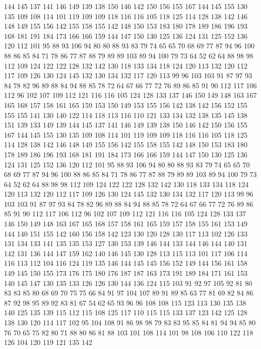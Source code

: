 144 145 137 141 146 149 139 138 150 146 142 150 156 155 167 144 145 155 130 135
109 108 114 101 119 109 109 118 116 116 105 118 125 114 128 138 142 146 148 149
155 156 142 155 158 155 142 148 150 153 183 180 178 189 186 196 193 168 181 191
184 173 166 166 159 144 147 150 130 125 136 124 131 125 152 136 120 112 101 95
88 93 106 94 80 80 88 93 83 79 74 65 65 70 68 69 77 87 94 96
100 88 86 85 84 71 78 86 77 87 88 79 89 89 103 89 94 100 79 73
64 52 62 64 88 98 98 112 109 124 122 122 128 132 142 130 118 133 134 118
124 120 113 132 120 112 117 109 126 130 124 145 132 130 134 132 117 120 113 99
96 103 103 91 87 97 93 84 78 82 96 89 88 84 94 88 85 78 72 64
67 66 77 72 76 89 86 85 91 90 112 117 106 112 96 102 107 109 112 121
116 116 105 124 128 133 137 146 150 149 148 163 167 165 168 157 158 161 165 159
153 150 149 153 155 156 142 138 142 156 152 155 155 155 141 130 140 122 114 118
113 116 110 121 133 134 132 138 135 145 138 151 139 133 149 139 144 145 137 141
146 149 139 138 150 146 142 150 156 155 167 144 145 155 130 135 109 108 114 101
119 109 109 118 116 116 105 118 125 114 128 138 142 146 148 149 155 156 142 155
158 155 142 148 150 153 183 180 178 189 186 196 193 168 181 191 184 173 166 166
159 144 147 150 130 125 136 124 131 125 152 136 120 112 101 95 88 93 106 94
80 80 88 93 83 79 74 65 65 70 68 69 77 87 94 96 100 88 86 85
84 71 78 86 77 87 88 79 89 89 103 89 94 100 79 73 64 52 62 64
88 98 98 112 109 124 122 122 128 132 142 130 118 133 134 118 124 120 113 132
120 112 117 109 126 130 124 145 132 130 134 132 117 120 113 99 96 103 103 91
87 97 93 84 78 82 96 89 88 84 94 88 85 78 72 64 67 66 77 72
76 89 86 85 91 90 112 117 106 112 96 102 107 109 112 121 116 116 105 124
128 133 137 146 150 149 148 163 167 165 168 157 158 161 165 159 157 158 155 161
153 149 144 140 151 155 142 160 156 158 142 123 130 120 128 130 117 113 102 126
133 131 134 133 141 135 135 153 127 130 153 139 146 144 133 144 146 144 140 131
142 131 136 144 147 159 162 140 146 145 130 128 113 115 113 101 117 106 114 116
113 112 104 116 124 119 135 146 144 145 145 156 152 149 144 156 161 158 149 145
150 155 173 176 175 180 176 187 187 163 173 191 189 184 171 161 153 140 145 147
130 135 133 126 126 130 144 136 124 115 103 91 92 97 105 92 81 80 83 83
85 80 68 69 70 75 75 66 84 91 97 104 107 89 91 89 85 63 77 81
69 82 84 86 87 92 98 95 89 92 83 81 67 54 62 65 93 96 96 108
108 115 123 113 130 135 138 140 125 135 139 115 112 115 108 125 117 110 115 115
133 137 123 142 125 128 138 130 120 114 117 102 95 104 108 91 86 98 98 79
83 83 95 85 84 81 94 94 85 80 76 70 65 75 82 80 71 88 80 86
81 88 103 101 108 114 101 98 108 106 110 122 118 126 104 120 119 121 135 142
